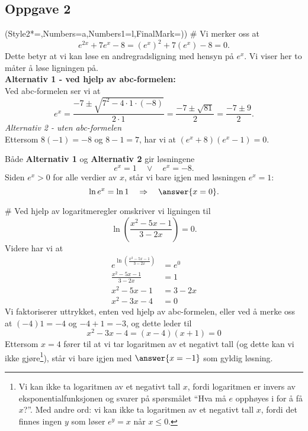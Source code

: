 \subsection*{Oppgave 2}
\begin{easylist}[enumerate]
\ListProperties(Style2*=,Numbers=a,Numbers1=l,FinalMark={)})
# Vi merker oss at
\begin{equation*}
	e^{2x}+7e^x -8 = \left(e^ x\right)^2 + 7\left(e^ x\right) - 8 =0.
\end{equation*}
Dette betyr at vi kan løse en andregradsligning med hensyn på $e^x$. 
Vi viser her to måter å løse ligningen på.\\
\textbf{Alternativ 1 - ved hjelp av abc-formelen:} \\
Ved abc-formelen ser vi at
\begin{equation*}
	e^x = \frac{-7\pm \sqrt{7^2-4\cdot1\cdot(-8)}}{2\cdot1}	 
	= \frac{-7\pm \sqrt{81}}{2} 
	= \frac{-7\pm 9}{2}.
\end{equation*}
\textit{Alternativ 2 - uten abc-formelen}\\
Ettersom  $ 8(-1)=-8 $ og $ 8-1=7 $, har vi at $(e^x +8)(e^x-1)=0$.

Både \textbf{Alternativ 1} og \textbf{Alternativ 2} gir løsningene
\begin{equation*}
e^x = 1 
\quad\vee\quad 
e^x = -8.
\end{equation*}
Siden $e^x > 0$ for alle verdier av $x$, står vi bare igjen med løsningen $e^x=1$:
\begin{equation*}
	\ln e^x = \ln 1 \quad \Rightarrow \quad \answer{x = 0}.
\end{equation*}


# Ved hjelp av logaritmeregler omskriver vi ligningen til
\begin{equation*}
	\ln \left(\frac{x^2-5x-1}{3-2x}\right)=0.
\end{equation*}
Videre har vi at
\begin{align*}
	e^{\ln \left(\frac{x^2-5x-1}{3-2x}\right)}&=e^0 \\
	\frac{x^2-5x-1}{3-2x} &= 1 \\
	x^2-5x-1 &= 3-2x \\
	x^2-3x-4 &= 0
\end{align*}
Vi faktoriserer uttrykket, enten ved hjelp av abc-formelen, eller ved å merke oss at $ (-4)1 =-4 $ og $ -4+1=-3 $, og dette leder til
\begin{equation*}
	x^2-3x-4 = (x-4)(x+1)=0
\end{equation*}
Ettersom $ x=4 $ fører til at vi tar logaritmen av et negativt tall (og dette kan vi ikke gjøre\footnote{
Vi kan ikke ta logaritmen av et negativt tall $x$, fordi logaritmen er invers av eksponentialfunksjonen og svarer på spørsmålet ``Hva må $e$ opphøyes i for å få $x$?''. 
Med andre ord: vi kan ikke ta logaritmen av et negativt tall $x$, fordi det finnes ingen $y$ som løser $e^y = x$ når $x \leq 0$.
}), står vi bare igjen med $\answer{ x=-1 }$ som gyldig løsning.
\end{easylist}


